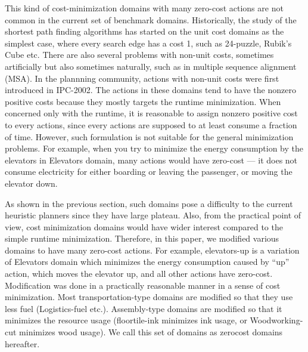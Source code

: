 
This kind of cost-minimization domains with many zero-cost actions are
not common in the current set of benchmark domains.
% 
Historically, the study of the shortest path finding algorithms has
started on the unit cost domains as the simplest case, where every
search edge has a cost 1,
such as 24-puzzle, Rubik's Cube etc.
There are also several problems with non-unit costs, sometimes
artificially but also sometimes naturally, such as in multiple
sequence alignment (MSA).
% 
In the plannning community, actions with non-unit costs were first introduced in 
IPC-2002. The actions in these domains tend to have the nonzero positive costs
because they mostly targets the runtime minimization.
When concerned
only with the runtime, it is reasonable to assign nonzero positive cost to
every actions, since every actions are supposed to at least consume a
fraction of time.
However, such formulation is not suitable for the general minimization
problems.
For example, when you try to minimize the energy consumption
by the elevators in Elevators domain, many actions would have zero-cost
--- it does not consume electricity for either boarding or leaving the
passenger, or moving the elevator down.

As shown in the previous section, such domains pose a
difficulty to the current heuristic planners since they have large plateau.
Also, from the practical point of
view, cost minimization domains would have wider interest compared to
the simple runtime minimization.
% 
Therefore, in this paper, we modified various domains to have many
zero-cost actions.  For example, elevators-up is a variation of
Elevators domain which minimizes
the energy consumption caused by ``up'' action, which moves the elevator
up, and all other actions have zero-cost.  Modification was done in a
practically reasonable manner in a sense of cost minimization. Most
transportation-type domains are modified so that they use less
fuel (Logistics-fuel etc.). Assembly-type domains are modified so that it minimizes the
resource usage (floortile-ink minimizes ink usage, or Woodworking-cut
minimizes wood usage).
We call this set of domains as zerocost domains hereafter.

